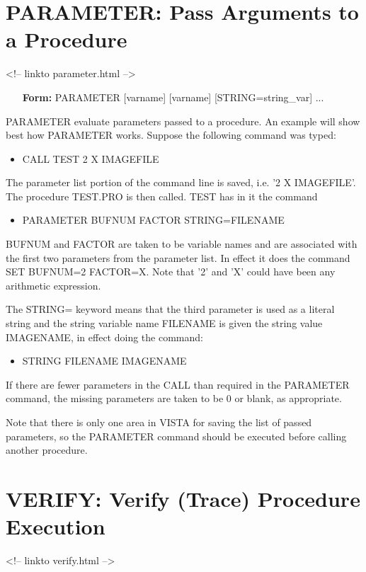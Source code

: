 \section{PARAMETER: Pass Arguments to a Procedure}
\begin{rawhtml}
<!-- linkto parameter.html -->
\end{rawhtml}

\begin{itemize}
  \item[\textbf{Form: } PARAMETER {[varname]} {[varname]} {[STRING=string\_var]} ...\hfill]{}
\end{itemize}
PARAMETER evaluate parameters passed to a procedure.  An example will show
best how PARAMETER works.  Suppose the following command was typed:
\begin{itemize}
  \item{CALL TEST 2 X IMAGEFILE}
\end{itemize}
The parameter list portion of the command line is saved, i.e.  '2 X
IMAGEFILE'.  The procedure TEST.PRO is then called.  TEST has in it the
command
\begin{itemize}
  \item{PARAMETER BUFNUM FACTOR STRING=FILENAME}
\end{itemize}
BUFNUM and FACTOR are taken to be variable names and are associated with
the first two parameters from the parameter list.  In effect it does the
command SET BUFNUM=2 FACTOR=X.  Note that '2' and 'X' could have been any
arithmetic expression.

The STRING= keyword means that the third parameter is used as a literal
string and the string variable name FILENAME is given the string value
IMAGENAME, in effect doing the command:
\begin{itemize}
  \item{STRING FILENAME IMAGENAME}
\end{itemize}

If there are fewer parameters in the CALL than required in the PARAMETER
command, the missing parameters are taken to be 0 or blank, as appropriate.

Note that there is only one area in VISTA for saving the list of passed
parameters, so the PARAMETER command should be executed before calling
another procedure.

\section{VERIFY: Verify (Trace) Procedure Execution}
\begin{rawhtml}
<!-- linkto verify.html -->
\end{rawhtml}

